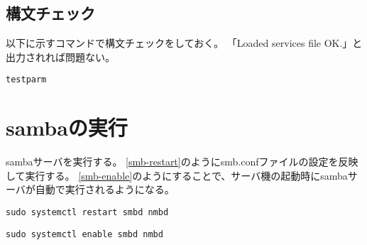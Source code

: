 \documentclass[a4paper,10pt]{jsarticle}
\begin{document}
    
    \subsection{構文チェック}
        以下に示すコマンドで構文チェックをしておく。
        「Loaded services file OK.」と出力されれば問題ない。

        \begin{lstlisting}[caption=sambaの構文チェック,label=smb-check]
            testparm
        \end{lstlisting}

\section{sambaの実行}
    sambaサーバを実行する。
    \ref{smb-restart}のようにsmb.confファイルの設定を反映して実行する。
    \ref{smb-enable}のようにすることで、サーバ機の起動時にsambaサーバが自動で実行されるようになる。

    \begin{lstlisting}[caption=設定の反映とsambaサーバの実行,label=smb-restart]
        sudo systemctl restart smbd nmbd
    \end{lstlisting}

    \begin{lstlisting}[caption=サーバの自動起動,label=smb-enable]
        sudo systemctl enable smbd nmbd
    \end{lstlisting}
\end{document}
